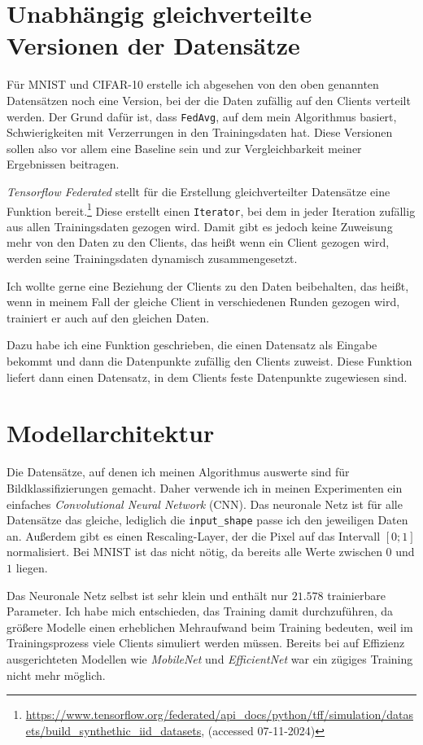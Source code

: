 \section{Unabhängig gleichverteilte Versionen der Datensätze}\label{sec:iid-dataset-creation}
Für MNIST und CIFAR-10 erstelle ich abgesehen von den oben genannten Datensätzen noch eine Version, bei der die Daten zufällig auf den Clients verteilt werden. Der Grund dafür ist, dass \texttt{FedAvg}, auf dem mein Algorithmus basiert, Schwierigkeiten mit Verzerrungen in den Trainingsdaten hat. Diese Versionen sollen also vor allem eine Baseline sein und zur Vergleichbarkeit meiner Ergebnissen beitragen.

\textit{Tensorflow Federated} stellt für die Erstellung gleichverteilter Datensätze eine Funktion bereit.\footnote{\url{https://www.tensorflow.org/federated/api_docs/python/tff/simulation/datasets/build_synthethic_iid_datasets}, (accessed 07-11-2024)} Diese erstellt einen \texttt{Iterator}, bei dem in jeder Iteration zufällig aus allen Trainingsdaten gezogen wird. Damit gibt es jedoch keine Zuweisung mehr von den Daten zu den Clients, das heißt wenn ein Client gezogen wird, werden seine Trainingsdaten dynamisch zusammengesetzt.

Ich wollte gerne eine Beziehung der Clients zu den Daten beibehalten, das heißt, wenn in meinem Fall der gleiche Client in verschiedenen Runden gezogen wird, trainiert er auch auf den gleichen Daten.

Dazu habe ich eine Funktion geschrieben, die einen Datensatz als Eingabe bekommt und dann die Datenpunkte zufällig den Clients zuweist. Diese Funktion liefert dann einen Datensatz, in dem Clients feste Datenpunkte zugewiesen sind.

\section{Modellarchitektur}
Die Datensätze, auf denen ich meinen Algorithmus auswerte sind für Bildklassifizierungen gemacht. Daher verwende ich in meinen Experimenten ein einfaches \textit{Convolutional Neural Network} (CNN). Das neuronale Netz ist für alle Datensätze das gleiche, lediglich die \texttt{input\_shape} passe ich den jeweiligen Daten an. Außerdem gibt es einen Rescaling-Layer, der die Pixel auf das Intervall $[0;1]$ normalisiert. Bei MNIST ist das nicht nötig, da bereits alle Werte zwischen $0$ und $1$ liegen.

Das Neuronale Netz selbst ist sehr klein und enthält nur $21.578$ trainierbare Parameter. Ich habe mich entschieden, das Training damit durchzuführen, da größere Modelle einen erheblichen Mehraufwand beim Training bedeuten, weil im Trainingsprozess viele Clients simuliert werden müssen. Bereits bei auf Effizienz ausgerichteten Modellen wie \textit{MobileNet} \cite{howard:2017} und \textit{EfficientNet} \cite{tan:2019} war ein zügiges Training nicht mehr möglich.

